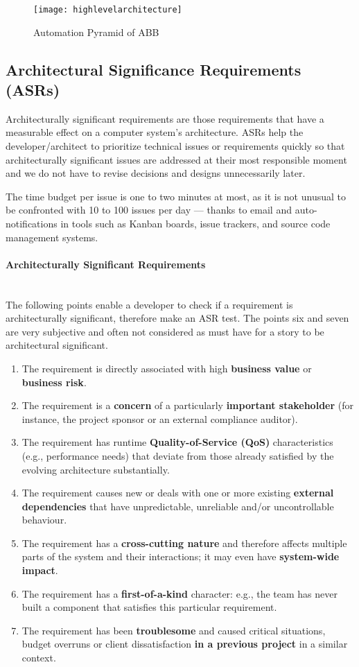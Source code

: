 \begin{figure}[H]
	\center
	\texttt{[image: highlevelarchitecture]}
	\caption{Automation Pyramid of ABB}
	\label{fig:automationpyramid}
\end{figure}

\subsection{Architectural Significance Requirements (ASRs)}
Architecturally significant requirements are those requirements that have a measurable effect on a computer system’s architecture. ASRs help the developer/architect to prioritize technical issues or requirements quickly so that architecturally significant issues are addressed at their most responsible moment and we do not have to revise decisions and designs unnecessarily later.

The time budget per issue is one to two minutes at most, as it is not unusual to be confronted with 10 to 100 issues per day — thanks to email and auto-notifications in tools such as Kanban boards, issue trackers, and source code management systems.

\paragraph{Architecturally Significant Requirements} \hfill \\
The following points enable a developer to check if a requirement is architecturally significant, therefore make an ASR test. The points six and seven are very subjective and often not considered as must have for a story to be architectural significant.

\begin{enumerate}
	\item The requirement is directly associated with high \textbf{business value} or \textbf{business risk}.
	\item The requirement is a \textbf{concern} of a particularly \textbf{important stakeholder} (for instance, the project sponsor or an external compliance auditor).
	\item The requirement has runtime \textbf{Quality-of-Service (QoS)} characteristics (e.g., performance needs) that deviate from those already satisfied by the evolving architecture substantially.
	\item The requirement causes new or deals with one or more existing \textbf{external dependencies} that have unpredictable, unreliable and/or uncontrollable behaviour.
	\item The requirement has a \textbf{cross-cutting nature} and therefore affects multiple parts of the system and their interactions; it may even have \textbf{system-wide impact}.
	\item The requirement has a \textbf{first-of-a-kind} character: e.g., the team has never built a component that satisfies this particular requirement.
	\item The requirement has been \textbf{troublesome} and caused critical situations, budget overruns or client dissatisfaction \textbf{in a previous project} in a similar context.
\end{enumerate}


